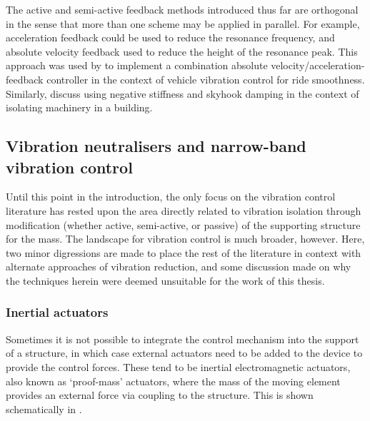 \documentclass[11pt,a4paper]{memoir}
\begin{document}
The active and semi-active feedback methods introduced thus far are orthogonal in the sense that more than one scheme may be applied in parallel.
For example, acceleration feedback could be used to reduce the resonance frequency, and absolute velocity feedback used to reduce the height of the resonance peak.
This approach was used by \textcite{savaresi2007} to implement a combination absolute velocity/acceleration-feedback controller in the context of vehicle vibration control for ride smoothness.
Similarly, \textcite{gavin2007-jsv} discuss using negative stiffness and skyhook damping in the context of isolating machinery in a building.




\subsection{Vibration neutralisers and narrow-band vibration control}

Until this point in the introduction, the only focus on the vibration control literature has rested upon the area directly related to vibration isolation through modification (whether active, semi-active, or passive) of the supporting structure for the mass.
The landscape for vibration control is much broader, however.
Here, two minor digressions are made to place the rest of the literature in context with alternate approaches of vibration reduction, and some discussion made on why the techniques herein were deemed unsuitable for the work of this thesis.


\subsubsection{Inertial actuators}

Sometimes it is not possible to integrate the control mechanism into the support of a structure, in which case external actuators need to be added to the device to provide the control forces.
These tend to be inertial electromagnetic actuators, also known as `proof-mass' actuators, where the mass of the moving element provides an external force via coupling to the structure.
This is shown schematically in .

\begin{figure}
\end{figure}
\end{document}
